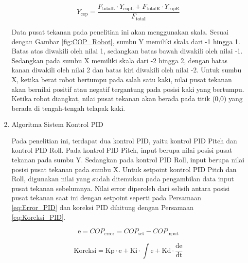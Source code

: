 \begin{enumerate}[label=\Alph*.]
    \begin{equation}
      Y_{\mathrm{cop}} = \frac{F_{\mathrm{totalL}} \cdot Y_{\mathrm{copL}} + F_{\mathrm{totalR}} \cdot Y_{\mathrm{copR}}}{F_{\mathrm{total}}}
      \label{eq:COP_Y_Robot}
    \end{equation}

    \hspace*{1em} Data pusat tekanan pada penelitian ini akan menggunakan skala. Sesuai dengan Gambar \ref{fig:COP_Robot}, sumbu Y memiliki skala dari -1 hingga 1. Batas atas diwakili oleh nilai 1, sedangkan batas bawah diwakili oleh nilai -1. Sedangkan pada sumbu X memiliki skala dari -2 hingga 2, dengan batas kanan diwakili oleh nilai 2 dan batas kiri diwakili oleh nilai -2. Untuk sumbu X, ketika berat robot bertumpu pada salah satu kaki, nilai pusat tekanan akan bernilai positif atau negatif tergantung pada posisi kaki yang bertumpu. Ketika robot diangkat, nilai pusat tekanan akan berada pada titik (0,0) yang berada di tengah-tengah telapak kaki. 

    \item Algoritma Sistem Kontrol PID
    \label{subsec:algoritmakontrolpid}

    \hspace*{1em} Pada penelitian ini, terdapat dua kontrol PID, yaitu kontrol PID Pitch dan kontrol PID Roll. Pada kontrol PID Pitch, input berupa nilai posisi pusat tekanan pada sumbu Y. Sedangkan pada kontrol PID Roll, input berupa nilai posisi pusat tekanan pada sumbu X. Untuk setpoint kontrol PID Pitch dan Roll, digunakan nilai yang sudah ditemukan pada pengambilan data input pusat tekanan sebelumnya. Nilai error diperoleh dari selisih antara posisi pusat tekanan saat ini dengan setpoint seperti pada Persamaan \ref{eq:Error_PID} dan koreksi PID dihitung dengan Persamaan \ref{eq:Koreksi_PID}.

    \begin{equation}
      \mathrm{e} = COP_{\mathrm{error}} = COP_{\mathrm{set}} - COP_{\mathrm{input}}
      \label{eq:Error_PID}
    \end{equation}

    \begin{equation}
      \mathrm{Koreksi} = \mathrm{Kp} \cdot \mathrm{e} + \mathrm{Ki} \cdot \int \mathrm{e} + \mathrm{Kd} \cdot \frac{\mathrm{de}}{\mathrm{dt}}
      \label{eq:Koreksi_PID}
    \end{equation}


\end{enumerate}
